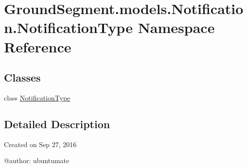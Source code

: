 \hypertarget{namespace_ground_segment_1_1models_1_1_notification_1_1_notification_type}{}\section{Ground\+Segment.\+models.\+Notification.\+Notification\+Type Namespace Reference}
\label{namespace_ground_segment_1_1models_1_1_notification_1_1_notification_type}
\subsection*{Classes}
\begin{DoxyCompactItemize}
\item 
class \hyperlink{class_ground_segment_1_1models_1_1_notification_1_1_notification_type_1_1_notification_type}{Notification\+Type}
\end{DoxyCompactItemize}


\subsection{Detailed Description}
\begin{DoxyVerb}Created on Sep 27, 2016

@author: ubuntumate
\end{DoxyVerb}
 